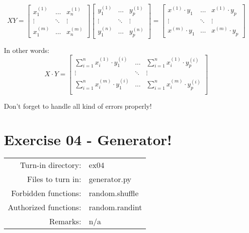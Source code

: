 \documentclass[]{article}
\begin{document}
\large

\[
X  Y = 
\begin{bmatrix} 
x_{1}^{(1)} & \dots & x_{n}^{(1)}  \\ 
\vdots & \ddots & \vdots \\ 
x_{1}^{(m)} & \dots & x_{n}^{(m)} 
\end{bmatrix}  
\begin{bmatrix} 
y_{1}^{(1)} & \dots & y_{p}^{(1)}  \\ 
\vdots & \ddots & \vdots \\ 
y_{1}^{(n)} & \dots & y_{p}^{(n)} 
\end{bmatrix} = 
\begin{bmatrix} 
x^{(1)} \cdot y_1  & \dots & x^{(1)} \cdot y_{p} \\ 
\vdots & \ddots & \vdots \\ 
x^{(m)} \cdot y_1 & \dots & x^{(m)} \cdot y_{p}
\end{bmatrix}
\] \normalsize

In other words: ​ \large \[
X \cdot Y = 
\begin{bmatrix} 
\sum_{i = 1}^{n} x_{i}^{(1)} \cdot y_{1}^{(i)} & \dots & \sum_{i=1}^{n} x_{i}^{(1)} \cdot y_{p}^{(i)} \\
\vdots & \ddots & \vdots \\ 
\sum_{i = 1}^{n} x_{i}^{(m)} \cdot y_{1}^{(i)} & \dots & \sum_{i=1}^{n} x_{i}^{(m)} \cdot y_{p}^{(i)} \\
\end{bmatrix}
\] \normalsize

Don't forget to handle all kind of errors properly!

\hypertarget{section}{%
\section{}\label{section}}

\clearpage

\hypertarget{exercise-04---generator-1}{%
\section{Exercise 04 - Generator!}\label{exercise-04---generator-1}}

\begin{longtable}[]{@{}rl@{}}
\toprule
\endhead
Turn-in directory: & ex04\tabularnewline
Files to turn in: & generator.py\tabularnewline
Forbidden functions: & random.shuffle\tabularnewline
Authorized functions: & random.randint\tabularnewline
Remarks: & n/a\tabularnewline
\bottomrule
\end{longtable}
\end{document}
